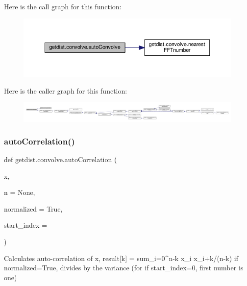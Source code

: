 Here is the call graph for this function\+:
\nopagebreak
\begin{figure}[H]
\begin{center}
\leavevmode
\includegraphics[width=350pt]{namespacegetdist_1_1convolve_af6628a68c41ddfddec7944d891a31800_cgraph}
\end{center}
\end{figure}
Here is the caller graph for this function\+:
\nopagebreak
\begin{figure}[H]
\begin{center}
\leavevmode
\includegraphics[width=350pt]{namespacegetdist_1_1convolve_af6628a68c41ddfddec7944d891a31800_icgraph}
\end{center}
\end{figure}
\mbox{\label{namespacegetdist_1_1convolve_ae675446f66ae37d976900cf3844eb726}} 
\subsubsection{\texorpdfstring{auto\+Correlation()}{autoCorrelation()}}
{\footnotesize\ttfamily def getdist.\+convolve.\+auto\+Correlation (\begin{DoxyParamCaption}\item[{}]{x,  }\item[{}]{n = {\ttfamily None},  }\item[{}]{normalized = {\ttfamily True},  }\item[{}]{start\+\_\+index = {} }\end{DoxyParamCaption})}

\begin{DoxyVerb}    Calculates auto-correlation of x, result[k] = sum_{i=0}^{n-k} x_i x_{i+k}/(n-k)
    if normalized=True, divides by the variance (for if start_index=0, first number is one)
\end{DoxyVerb}
 

